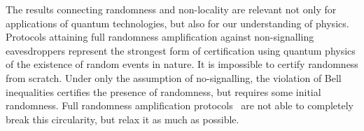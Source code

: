 \documentclass[11pt,a4paper]{article}
\begin{document}
{%

The results connecting randomness and non-locality are relevant
not only for applications of quantum technologies,
but also for our %
understanding of physics.
Protocols attaining full randomness amplification against non-signalling eavesdroppers represent the strongest form of certification using quantum physics of the
existence of random events in nature. It is impossible to certify randomness from scratch. Under only the assumption of no-signalling, the violation of Bell inequalities certifies the presence of randomness, but requires
some initial randomness. Full randomness amplification protocols~\cite{coudron_yuen, Chung, rodrigo, BRGHHHSW 15, Bouda, RBHHHW 15, WBGHHHPR 16} are not able to completely break this circularity, but relax it as much as
possible.

}
\end{document}
